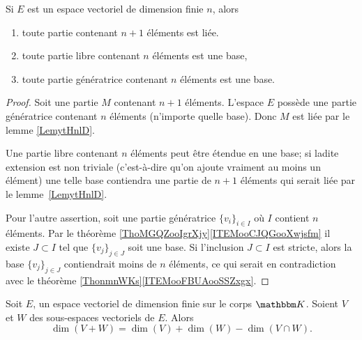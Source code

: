 \begin{proposition}     \label{PROPooVEVCooHkrldw}
    Si \( E\) est un espace vectoriel de dimension finie \( n\), alors 
    \begin{enumerate}
        \item       \label{ITEMooZNLDooBISkJyBS}
            toute partie contenant \( n+1\) éléments est liée.
        \item       \label{ITEMooSGGCooOUsuBs}
            toute partie libre contenant \( n\) éléments est une base,
        \item
            toute partie génératrice contenant \( n\) éléments est une base.
    \end{enumerate}
\end{proposition}

\begin{proof}
    Soit une partie \( M\) contenant \( n+1\) éléments. L'espace \( E\) possède une partie génératrice contenant \( n\) éléments (n'importe quelle base). Donc \( M\) est liée par le lemme \ref{LemytHnlD}.

    Une partie libre contenant \( n\) éléments peut être étendue en une base; si ladite extension est non triviale (c'est-à-dire qu'on ajoute vraiment au moins un élément) une telle base contiendra une partie de \( n+1\) éléments qui serait liée par le lemme~\ref{LemytHnlD}.

    Pour l'autre assertion, soit une partie génératrice \( \{ v_i \}_{i\in I}\) où \( I\) contient \( n\) éléments. Par le théorème \ref{ThoMGQZooIgrXjy}\ref{ITEMooCJQGooXwjsfm} il existe \( J\subset I\) tel que \( \{ v_j \}_{j\in J}\) soit une base. Si l'inclusion \( J\subset I\) est stricte, alors la base \( \{ v_j \}_{j\in J}\) contiendrait moins de \( n\) éléments, ce qui serait en contradiction avec le théorème \ref{ThonmnWKs}\ref{ITEMooFBUAooSSZxgx}.
\end{proof}

\begin{proposition}      \label{PROPooQCIXooHIyPPq}
    Soit \( E\), un espace vectoriel de dimension finie sur le corps $\eK$. Soient \( V\) et \( W\) des sous-espaces vectoriels de \( E\). Alors
    \begin{equation}
        \dim(V+W)=\dim(V)+\dim(W)-\dim(V\cap W).
    \end{equation}
\end{proposition}

